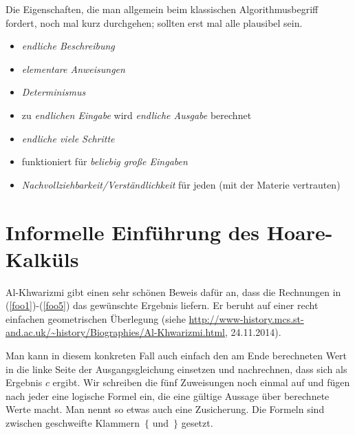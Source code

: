 %
\begin{tutorium}
  Die Eigenschaften, die man allgemein beim klassischen
  Algorithmusbegriff fordert, noch mal kurz durchgehen; sollten erst
  mal alle plausibel sein.
  \begin{itemize}
  \item \emph{endliche Beschreibung}
  \item \emph{elementare Anweisungen}
  \item \emph{Determinismus}
  \item zu \emph{endlichen Eingabe} wird \emph{endliche Ausgabe}
    berechnet
  \item \emph{endliche viele Schritte}
  \item funktioniert für \emph{beliebig große Eingaben}
  \item \emph{Nachvollziehbarkeit/Verständlichkeit} für jeden (mit der
    Materie vertrauten)
  \end{itemize}
\end{tutorium}

\Tut\section{Informelle Einf\"uhrung des Hoare-Kalk\"uls}

Al-Khwarizmi gibt einen sehr schönen Beweis dafür an, dass die
Rechnungen in (\ref{foo1})-(\ref{foo5}) das gewünschte Ergebnis
liefern. Er beruht auf einer recht einfachen geometrischen Überlegung
(siehe \zB
\url{http://www-history.mcs.st-and.ac.uk/~history/Biographies/Al-Khwarizmi.html},
24.11.2014).

Man kann in diesem konkreten Fall auch einfach den am Ende berechneten
Wert \zB in die linke Seite der Ausgangsgleichung einsetzen und
nachrechnen, dass sich als Ergebnis $c$ ergibt. Wir schreiben die fünf
Zuweisungen noch einmal auf und fügen nach jeder eine logische Formel
ein, die eine gültige Aussage über berechnete Werte macht. Man nennt
so etwas auch eine Zusicherung. Die Formeln sind zwischen geschweifte
Klammern~$\{$ und~$\}$ gesetzt. 

